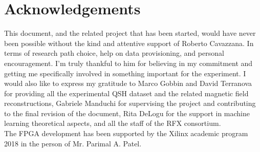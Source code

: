 
\clearpage
\chapter*{Acknowledgements}
\thispagestyle{empty}
This document, and the related project that has been started, would have never been
possible without the kind and attentive support of Roberto Cavazzana. In terms of research path choice, help on data provisioning, and personal encouragement. I'm truly thankful to him for believing in my commitment and getting me specifically involved in something important for the experiment.
I would also like to express my gratitude to Marco Gobbin and David Terranova for providing all the experimental QSH dataset and the related magnetic field reconstructions, Gabriele Manduchi for supervising the project and contributing to the final revision of the document, Rita DeLogu for the support in machine learning theoretical aspects, and all the staff of the RFX consortium. \\
The FPGA development has been supported by the Xilinx academic program 2018 in the person of Mr. Parimal A. Patel.
\clearpage


